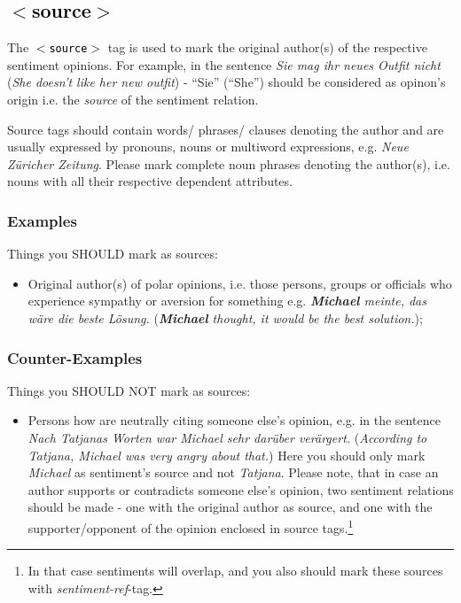 \documentclass[11pt,a4paper]{article}
\newcommand{\xmltag}[1]{\textcolor{black}{{\small$<$#1$>$}}}
\begin{document}

\subsection{\xmltag{source}}
The \texttt{\xmltag{source}} tag is used to mark the original author(s)
of the respective sentiment opinions. For example, in the sentence \textit{Sie
  mag ihr neues Outfit nicht} (\textit{She doesn't like her new
  outfit}) - ``Sie'' (``She'') should be considered as opinon's origin
i.e. the \textit{source} of the sentiment relation.

Source tags should contain words/ phrases/ clauses denoting the author and are usually expressed by pronouns, nouns or multiword expressions,
e.g. \textit{Neue Z\"uricher Zeitung}. Please mark complete noun
phrases denoting the author(s), i.e. nouns with all their respective
dependent attributes.

\subsubsection{Examples}
Things you SHOULD mark as sources:
\begin{itemize}
  \item Original author(s) of polar opinions, i.e. those persons,
    groups or officials who experience sympathy or aversion for
    something e.g. \textit{\textbf{Michael} meinte, das w\"are die
      beste L\"osung.}  (\textit{\textbf{Michael} thought, it would be the
      best solution.});
\end{itemize}

\subsubsection{Counter-Examples}
Things you SHOULD NOT mark as sources:
\begin{itemize}
  \item Persons how are neutrally citing someone else's opinion,
    e.g. in the sentence \textit{Nach Tatjanas Worten war Michael sehr
      dar\"uber ver\"argert.} (\textit{According to Tatjana, Michael
      was very angry about that.}) Here you should only mark
    \textit{Michael} as sentiment's source and not \textit{Tatjana}. Please note, that in case an author
    supports or contradicts someone else's opinion, two sentiment
    relations should be made - one with the original author as source,
    and one with the supporter/opponent of the opinion enclosed in
    source tags.\footnote{In that case sentiments will overlap, and
      you also should mark these sources with \textit{sentiment-ref}-tag.}
\end{itemize}
\end{document}
